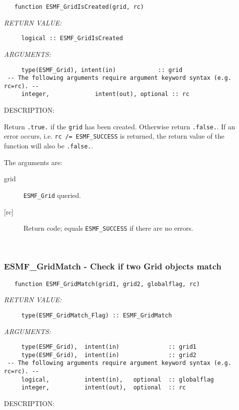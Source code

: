  
\begin{verbatim}   function ESMF_GridIsCreated(grid, rc)\end{verbatim}{\em RETURN VALUE:}
\begin{verbatim}     logical :: ESMF_GridIsCreated\end{verbatim}{\em ARGUMENTS:}
\begin{verbatim}     type(ESMF_Grid), intent(in)            :: grid
 -- The following arguments require argument keyword syntax (e.g. rc=rc). --
     integer,             intent(out), optional :: rc
 \end{verbatim}
{\sf DESCRIPTION:\\ }


     Return {\tt .true.} if the {\tt grid} has been created. Otherwise return
     {\tt .false.}. If an error occurs, i.e. {\tt rc /= ESMF\_SUCCESS} is
     returned, the return value of the function will also be {\tt .false.}.
  
   The arguments are:
     \begin{description}
     \item[grid]
       {\tt ESMF\_Grid} queried.
     \item[{[rc]}]
       Return code; equals {\tt ESMF\_SUCCESS} if there are no errors.
     \end{description}
   
 
\mbox{}\hrulefill\ 
 
\subsubsection [ESMF\_GridMatch] {ESMF\_GridMatch - Check if two Grid objects match}


 
\begin{verbatim}   function ESMF_GridMatch(grid1, grid2, globalflag, rc)\end{verbatim}{\em RETURN VALUE:}
\begin{verbatim}     type(ESMF_GridMatch_Flag) :: ESMF_GridMatch
 \end{verbatim}{\em ARGUMENTS:}
\begin{verbatim}     type(ESMF_Grid),  intent(in)              :: grid1
     type(ESMF_Grid),  intent(in)              :: grid2
 -- The following arguments require argument keyword syntax (e.g. rc=rc). --
     logical,          intent(in),   optional  :: globalflag
     integer,          intent(out),  optional  :: rc\end{verbatim}
{\sf DESCRIPTION:\\ }


